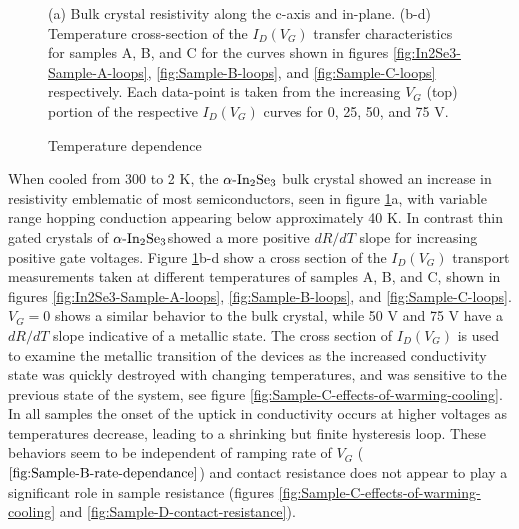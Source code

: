 \begin{figure}
\begin{centering}
{}
\par\end{centering}
\caption{Temperature dependence\label{fig:Temperature-dependence}}

(a) Bulk crystal resistivity along the c-axis and in-plane. (b-d)
Temperature cross-section of the $I_{D}\left(V_{G}\right)$ transfer
characteristics for samples A, B, and C for the curves shown in figures
\ref{fig:In2Se3-Sample-A-loops}, \ref{fig:Sample-B-loops}, and \ref{fig:Sample-C-loops}
respectively. Each data-point is taken from the increasing $V_{G}$
(top) portion of the respective $I_{D}\left(V_{G}\right)$ curves
for 0, 25, 50, and 75 V.
\end{figure}

When cooled from 300 to 2 K, the $\textrm{\ensuremath{\alpha}-In}_{2}\textrm{Se}_{3}$
bulk crystal showed an increase in resistivity emblematic of most
semiconductors, seen in figure \ref{fig:Temperature-dependence}a,
with variable range hopping conduction appearing below approximately
40 K. In contrast thin gated crystals of $\textrm{\ensuremath{\alpha}-In}_{2}\textrm{Se}_{3}$showed
a more positive $dR/dT$ slope for increasing positive gate voltages.
Figure \ref{fig:Temperature-dependence}b-d show a cross section of
the $I_{D}\left(V_{G}\right)$ transport measurements taken at different
temperatures of samples A, B, and C, shown in figures \ref{fig:In2Se3-Sample-A-loops},
\ref{fig:Sample-B-loops}, and \ref{fig:Sample-C-loops}. $V_{G}=0$
shows a similar behavior to the bulk crystal, while 50 V and 75 V
have a $dR/dT$ slope indicative of a metallic state. The cross section
of $I_{D}\left(V_{G}\right)$ is used to examine the metallic transition
of the devices as the increased conductivity state was quickly destroyed
with changing temperatures, and was sensitive to the previous state
of the system, see figure \ref{fig:Sample-C-effects-of-warming-cooling}.
In all samples the onset of the uptick in conductivity occurs at higher
voltages as temperatures decrease, leading to a shrinking but finite
hysteresis loop. These behaviors seem to be independent of ramping
rate of $V_{G}$ ($\ref{fig:Sample-B-rate-dependance}$) and contact
resistance does not appear to play a significant role in sample resistance
(figures \ref{fig:Sample-C-effects-of-warming-cooling} and \ref{fig:Sample-D-contact-resistance}).

